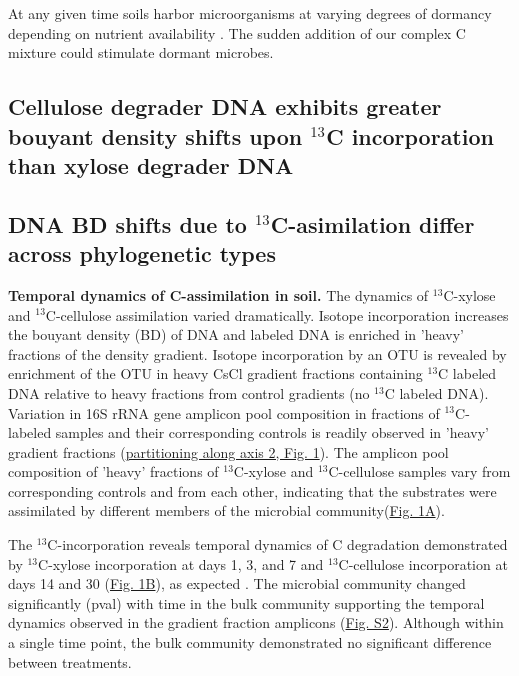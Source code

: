 At any given time soils harbor microorganisms at varying degrees of dormancy
depending on nutrient availability \citep{Jones_2010}. The sudden addition of
our complex C mixture could stimulate dormant microbes. 

\subsection{Cellulose degrader DNA exhibits greater bouyant density shifts upon $^{13}$C incorporation than xylose degrader DNA}
\subsection{DNA BD shifts due to $^{13}$C-asimilation differ across phylogenetic types}
\textbf{Temporal dynamics of C-assimilation in soil.}  
The dynamics of $^{13}$C-xylose and $^{13}$C-cellulose assimilation varied
dramatically. Isotope incorporation increases the bouyant density (BD) of DNA
and labeled DNA is enriched in 'heavy' fractions of the density gradient.
Isotope incorporation by an OTU is revealed by enrichment of the OTU in heavy
CsCl gradient fractions containing $^{13}$C labeled DNA relative to heavy
fractions from control gradients (no $^{13}$C labeled DNA). Variation in 16S
rRNA gene amplicon pool composition in fractions of $^{13}$C-labeled samples
and their corresponding controls is readily observed in 'heavy' gradient
fractions
(\href{https://www.authorea.com/users/3537/articles/3612/master/file/figures/ordination_all1/ordination_all1.png}{partitioning
along axis 2, Fig. 1}). The amplicon pool composition of 'heavy' fractions of
$^{13}$C-xylose and $^{13}$C-cellulose samples vary from corresponding controls
and from each other, indicating that the substrates were assimilated by
different members of the  microbial
community(\href{https://www.authorea.com/users/3537/articles/3612/master/file/figures/ordination_all1/ordination_all1.png}{Fig.
1A}).

The $^{13}$C-incorporation reveals temporal dynamics of C
degradation demonstrated by $^{13}$C-xylose incorporation at days
1, 3, and 7 and $^{13}$C-cellulose incorporation at days 14 and 30
(\href{https://www.authorea.com/users/3537/articles/3612/master/file/figures/ordination_all1/ordination_all1.png}{Fig.
1B}), as expected \citep{Amelung_2008}. The microbial community changed
significantly (pval) with time in the bulk community supporting the temporal
dynamics observed in the gradient fraction amplicons
(\href{https://authorea.com/users/3537/articles/8459/master/file/figures/bulk_ordination/bulk_ordination.png}{Fig.
S2}). Although within a single time point, the bulk community demonstrated no
significant difference between treatments. 


